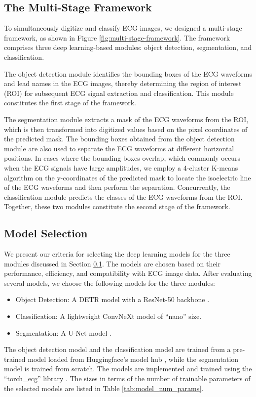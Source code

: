 \subsection{The Multi-Stage Framework}
\label{subsec:multi_stage_framework}


To simultaneously digitize and classify ECG images, we designed a multi-stage framework, as shown in Figure \ref{fig:multi-stage-framework}. The framework comprises three deep learning-based modules: object detection, segmentation, and classification.

The object detection module identifies the bounding boxes of the ECG waveforms and lead names in the ECG images, thereby determining the region of interest (ROI) for subsequent ECG signal extraction and classification. This module constitutes the first stage of the framework.

The segmentation module extracts a mask of the ECG waveforms from the ROI, which is then transformed into digitized values based on the pixel coordinates of the predicted mask. The bounding boxes obtained from the object detection module are also used to separate the ECG waveforms at different horizontal positions. In cases where the bounding boxes overlap, which commonly occurs when the ECG signals have large amplitudes, we employ a 4-cluster K-means algorithm on the y-coordinates of the predicted mask to locate the isoelectric line of the ECG waveforms and then perform the separation. Concurrently, the classification module predicts the classes of the ECG waveforms from the ROI. Together, these two modules constitute the second stage of the framework.

\subsection{Model Selection}
\label{subsec:model_selection}


We present our criteria for selecting the deep learning models for the three modules discussed in Section \ref{subsec:multi_stage_framework}. The models are chosen based on their performance, efficiency, and compatibility with ECG image data. After evaluating several models, we choose the following models for the three modules:
\begin{itemize}
\item[(1)] Object Detection: A DETR model \cite{carion2020DETR} with a ResNet-50 backbone \cite{resnet}.
\item[(2)] Classification: A lightweight ConvNeXt model \cite{Liu_2022_ConvNeXt} of ``nano'' size.
\item[(3)] Segmentation: A U-Net model \cite{unet}.
\end{itemize}
The object detection model and the classification model are trained from a pre-trained model loaded from Huggingface's model hub \cite{wolf-etal-2020-transformers}, while the segmentation model is trained from scratch. The models are implemented and trained using the ``torch\_ecg'' library \cite{torch_ecg_paper}. The sizes in terms of the number of trainable parameters of the selected models are listed in Table \ref{tab:model_num_params}.

